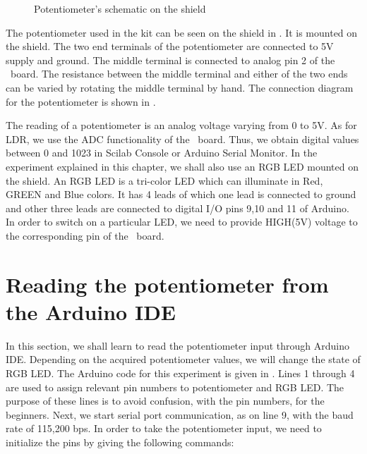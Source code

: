 \begin{figure}
\centering
{} \hfill
{}
\caption{Potentiometer's schematic on the shield}
\label{fig:potmeterconn}
\end{figure}

The potentiometer used in the kit can be seen on the shield in
.  It is
mounted on the shield. The two end terminals of the potentiometer are
connected to 5V supply and ground. The middle terminal is connected to
analog pin 2 of the \arduino\ board. The resistance between the middle
terminal and either of the two ends can be varied by rotating the
middle terminal by hand. The connection diagram for the potentiometer
is shown in .

The reading of a potentiometer is an analog voltage varying from 0 to
5V. As for LDR, we use the ADC functionality of the \arduino\
board. Thus, we obtain digital values between 0 and 1023 in Scilab Console or Arduino Serial Monitor. 
In the experiment explained in this chapter, we shall also use an RGB LED
mounted on the shield. An RGB LED is a tri-color LED which can illuminate in Red, GREEN and Blue colors. It has 4 leads of which one lead is connected to ground and other three leads are connected to digital I/O pins 9,10 and 11 of Arduino. In order to switch on a particular LED, we need to provide HIGH(5V) voltage to the corresponding pin of the \arduino\ board.


\section{Reading the potentiometer from the Arduino IDE}
In this section, we shall learn to read the potentiometer input
through Arduino IDE. Depending on the acquired potentiometer values,
we will change the state of RGB LED. The Arduino code for this
experiment is given in . Lines 1 through 4 are
used to assign relevant pin numbers to potentiometer and RGB LED. The
purpose of these lines is to avoid confusion, with the pin numbers,
for the beginners. Next, we start serial port communication, as on
line 9, with the baud rate of 115,200 bps. In order to take the
potentiometer input, we need to initialize the pins by giving the
following commands:

